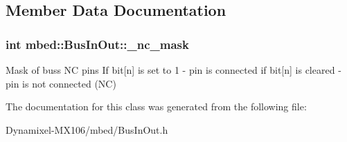 \subsection{Member Data Documentation}
\subsubsection[{\texorpdfstring{\+\_\+nc\+\_\+mask}{_nc_mask}}]{\setlength{\rightskip}{0pt plus 5cm}int mbed\+::\+Bus\+In\+Out\+::\+\_\+nc\+\_\+mask\hspace{0.3cm}{\ttfamily [protected]}}\hypertarget{classmbed_1_1_bus_in_out_af4a2854a611341b55a9b62075092a53f}{}\label{classmbed_1_1_bus_in_out_af4a2854a611341b55a9b62075092a53f}
Mask of bus\textquotesingle{}s NC pins If bit\mbox{[}n\mbox{]} is set to 1 -\/ pin is connected if bit\mbox{[}n\mbox{]} is cleared -\/ pin is not connected (NC) 

The documentation for this class was generated from the following file\+:\begin{DoxyCompactItemize}
\item 
Dynamixel-\/\+M\+X106/mbed/Bus\+In\+Out.\+h\end{DoxyCompactItemize}
